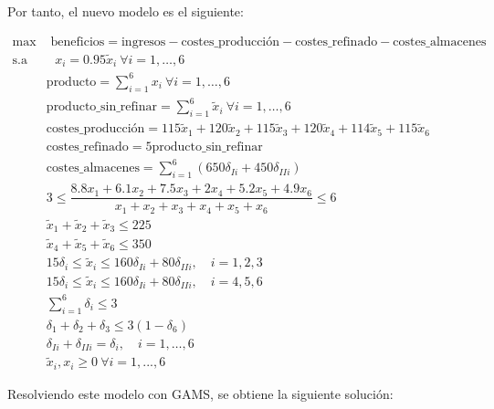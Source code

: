 \documentclass[12pt,a4paper,twoside,openright,titlepage,final]{article}
\begin{document}
Por tanto, el nuevo modelo es el siguiente:

\begin{align*}
\max & \text{ beneficios} = \text{ingresos} - \text{costes\_producción} - \text{costes\_refinado} - \text{costes\_almacenes}\\
\text{s.a} & \text{\ } x_i = 0.95\tilde{x}_i \ \forall i = 1, \dots, 6 \\
& \text{producto} = \sum_{i=1}^{6} x_i \ \forall i = 1, \dots, 6 \\
&\text{producto\_sin\_refinar} = \sum_{i=1}^{6} \tilde{x}_i \ \forall i = 1, \dots, 6\\
&\text{costes\_producción} = 115\tilde{x}_1 + 120\tilde{x}_2 + 115\tilde{x}_3 + 120\tilde{x}_4 + 114\tilde{x}_5 + 115\tilde{x}_6 \\
&\text{costes\_refinado} = 5\text{producto\_sin\_refinar} \\
&\text{costes\_almacenes} = \sum_{i=1}^{6} (650\delta_{Ii} + 450\delta_{IIi}) \\
& 3 \leq \dfrac{8.8x_1 + 6.1x_2 + 7.5x_3 + 2x_4 + 5.2x_5 + 4.9x_6}{x_1 + x_2 + x_3 + x_4 + x_5 + x_6} \leq 6\\
&\tilde{x}_1 + \tilde{x}_2 + \tilde{x}_3 \leq 225\\
&\tilde{x}_4 + \tilde{x}_5 + \tilde{x}_6 \leq 350\\
&15\delta_i \leq \tilde{x}_i \leq 160\delta_{Ii} + 80\delta_{IIi}, \quad i =1,2,3\\
&15\delta_i \leq \tilde{x}_i \leq 160\delta_{Ii} + 80\delta_{IIi}, \quad i =4,5,6 \\
&\sum_{i=1}^{6} \delta_i \leq 3\\
&\delta_1 + \delta_2 + \delta_3 \leq 3(1-\delta_6)\\
&\delta_{Ii} + \delta_{IIi} = \delta_i, \quad i = 1,\dots, 6\\
&\tilde{x}_i, x_i \geq 0 \ \forall i=1,...,6
\end{align*}

Resolviendo este modelo con GAMS, se obtiene la siguiente solución:
\end{document}
